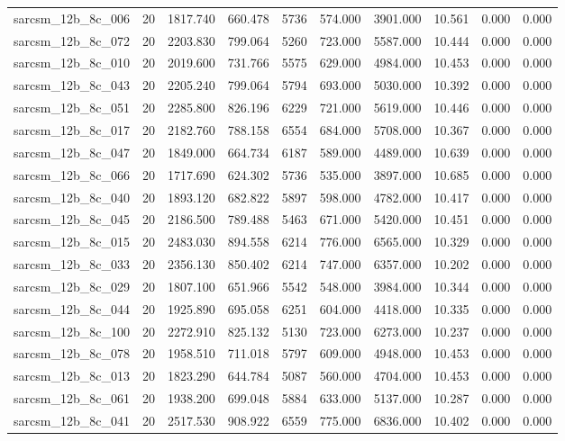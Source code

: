 \begin{tabular}{lrrrrrrrrr}
sarcsm\_12b\_8c\_006 & 20 & 1817.740 & 660.478 & 5736 & 574.000 & 3901.000 & 10.561 & 0.000 & 0.000 \\
sarcsm\_12b\_8c\_072 & 20 & 2203.830 & 799.064 & 5260 & 723.000 & 5587.000 & 10.444 & 0.000 & 0.000 \\
sarcsm\_12b\_8c\_010 & 20 & 2019.600 & 731.766 & 5575 & 629.000 & 4984.000 & 10.453 & 0.000 & 0.000 \\
sarcsm\_12b\_8c\_043 & 20 & 2205.240 & 799.064 & 5794 & 693.000 & 5030.000 & 10.392 & 0.000 & 0.000 \\
sarcsm\_12b\_8c\_051 & 20 & 2285.800 & 826.196 & 6229 & 721.000 & 5619.000 & 10.446 & 0.000 & 0.000 \\
sarcsm\_12b\_8c\_017 & 20 & 2182.760 & 788.158 & 6554 & 684.000 & 5708.000 & 10.367 & 0.000 & 0.000 \\
sarcsm\_12b\_8c\_047 & 20 & 1849.000 & 664.734 & 6187 & 589.000 & 4489.000 & 10.639 & 0.000 & 0.000 \\
sarcsm\_12b\_8c\_066 & 20 & 1717.690 & 624.302 & 5736 & 535.000 & 3897.000 & 10.685 & 0.000 & 0.000 \\
sarcsm\_12b\_8c\_040 & 20 & 1893.120 & 682.822 & 5897 & 598.000 & 4782.000 & 10.417 & 0.000 & 0.000 \\
sarcsm\_12b\_8c\_045 & 20 & 2186.500 & 789.488 & 5463 & 671.000 & 5420.000 & 10.451 & 0.000 & 0.000 \\
sarcsm\_12b\_8c\_015 & 20 & 2483.030 & 894.558 & 6214 & 776.000 & 6565.000 & 10.329 & 0.000 & 0.000 \\
sarcsm\_12b\_8c\_033 & 20 & 2356.130 & 850.402 & 6214 & 747.000 & 6357.000 & 10.202 & 0.000 & 0.000 \\
sarcsm\_12b\_8c\_029 & 20 & 1807.100 & 651.966 & 5542 & 548.000 & 3984.000 & 10.344 & 0.000 & 0.000 \\
sarcsm\_12b\_8c\_044 & 20 & 1925.890 & 695.058 & 6251 & 604.000 & 4418.000 & 10.335 & 0.000 & 0.000 \\
sarcsm\_12b\_8c\_100 & 20 & 2272.910 & 825.132 & 5130 & 723.000 & 6273.000 & 10.237 & 0.000 & 0.000 \\
sarcsm\_12b\_8c\_078 & 20 & 1958.510 & 711.018 & 5797 & 609.000 & 4948.000 & 10.453 & 0.000 & 0.000 \\
sarcsm\_12b\_8c\_013 & 20 & 1823.290 & 644.784 & 5087 & 560.000 & 4704.000 & 10.453 & 0.000 & 0.000 \\
sarcsm\_12b\_8c\_061 & 20 & 1938.200 & 699.048 & 5884 & 633.000 & 5137.000 & 10.287 & 0.000 & 0.000 \\
sarcsm\_12b\_8c\_041 & 20 & 2517.530 & 908.922 & 6559 & 775.000 & 6836.000 & 10.402 & 0.000 & 0.000 \\

\end{tabular}

